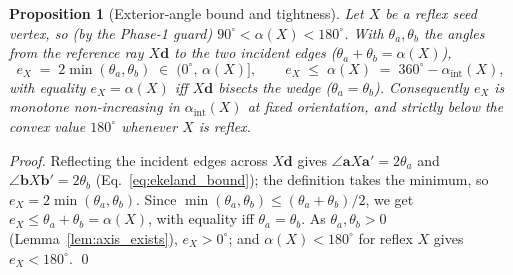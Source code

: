 \documentclass[10pt]{article}
\theoremstyle{plain}
\newtheorem{proposition}[theorem]{Proposition}
\theoremstyle{definition}
\begin{document}
\begin{proposition}[Exterior-angle bound and tightness]
\label{prop:sensitivity}
Let $X$ be a reflex seed vertex, so (by the Phase-1 guard)
$90^\circ<\alpha(X)<180^\circ$. With $\theta_a,\theta_b$ the angles from the
reference ray $X\mathbf{d}$ to the two incident edges
($\theta_a+\theta_b=\alpha(X)$),
\begin{equation}
  e_X \;=\; 2\min(\theta_a,\theta_b)
       \;\in\;(0^\circ,\,\alpha(X)],
  \qquad
  e_X \;\le\; \alpha(X) \;=\; 360^\circ-\alpha_{\mathrm{int}}(X),
\label{eq:sensitivity_bound}
\end{equation}
with equality $e_X=\alpha(X)$ iff $X\mathbf{d}$ bisects the wedge
($\theta_a=\theta_b$). Consequently $e_X$ is monotone non-increasing in
$\alpha_{\mathrm{int}}(X)$ at fixed orientation, and strictly below the
convex value $180^\circ$ whenever $X$ is reflex.
\end{proposition}
\begin{proof}
Reflecting the incident edges across $X\mathbf{d}$ gives
$\angle\mathbf{a}X\mathbf{a}'=2\theta_a$ and $\angle\mathbf{b}X\mathbf{b}'=2\theta_b$
(Eq.~\eqref{eq:ekeland_bound}); the definition takes the minimum, so
$e_X=2\min(\theta_a,\theta_b)$. Since $\min(\theta_a,\theta_b)\le(\theta_a+\theta_b)/2$,
we get $e_X\le\theta_a+\theta_b=\alpha(X)$, with equality iff
$\theta_a=\theta_b$. As $\theta_a,\theta_b>0$ (Lemma~\ref{lem:axis_exists}),
$e_X>0^\circ$; and $\alpha(X)<180^\circ$ for reflex $X$ gives $e_X<180^\circ$.
\qed
\end{proof}
\end{document}
